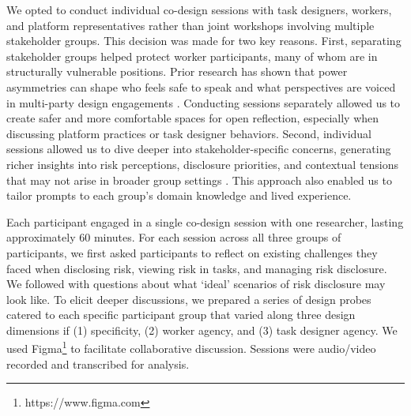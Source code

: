 We opted to conduct individual co-design sessions with task designers, workers, and platform representatives rather than joint workshops involving multiple stakeholder groups. This decision was made for two key reasons. First, separating stakeholder groups helped protect worker participants, many of whom are in structurally vulnerable positions. Prior research has shown that power asymmetries can shape who feels safe to speak and what perspectives are voiced in multi-party design engagements \cite{muller_participatory_nodate}. Conducting sessions separately allowed us to create safer and more comfortable spaces for open reflection, especially when discussing platform practices or task designer behaviors. Second, individual sessions allowed us to dive deeper into stakeholder-specific concerns, generating richer insights into risk perceptions, disclosure priorities, and contextual tensions that may not arise in broader group settings \cite{dillahunt2017designing}. This approach also enabled us to tailor prompts to each group’s domain knowledge and lived experience.



Each participant engaged in a single co-design session with one researcher, lasting approximately 60 minutes. For each session across all three groups of participants, we first asked participants to reflect on existing challenges they faced when disclosing risk, viewing risk in tasks, and managing risk disclosure. We followed with questions about what `ideal' scenarios of risk disclosure may look like. To elicit deeper discussions, we prepared a series of design probes catered to each specific participant group that varied along three design dimensions if (1) specificity, (2) worker agency, and (3) task designer agency. We used Figma\footnote{https://www.figma.com} to facilitate collaborative discussion. Sessions were audio/video recorded and transcribed for analysis.

